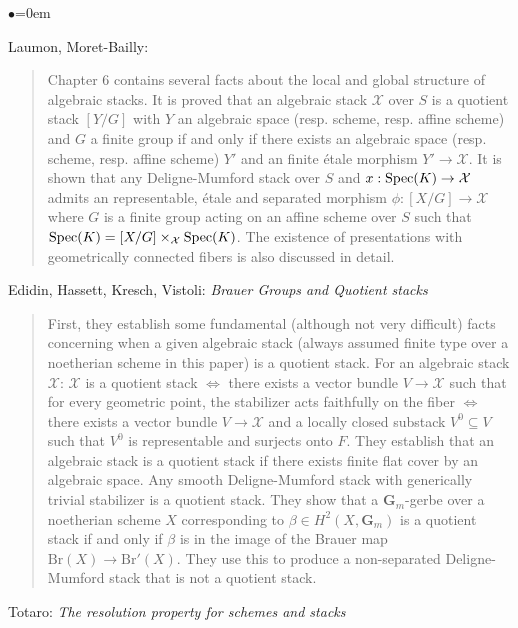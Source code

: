 \begin{list}{$\bullet$}{\leftmargin=0em}
\item Laumon, Moret-Bailly: \cite[Chapter 6]{lmb} 
\begin{quote}
Chapter 6 contains several facts about the local and global structure of 
algebraic stacks. It is proved that an algebraic stack $\mathcal{X}$ over $S$ 
is a 
quotient stack $[Y/G]$ with $Y$ an algebraic space (resp. scheme, resp. affine 
scheme) and $G$ a finite group if and only if there exists an algebraic space 
(resp. scheme, resp. affine scheme) $Y'$ and an finite \'etale morphism $Y' 
\to \mathcal{X}$. It is shown that any Deligne-Mumford stack over $S$ and
$x : \mathop{\rm Spec}(K) \to \mathcal{X}$ admits an representable, \'etale and
separated morphism $\phi : [X/G] \to \mathcal{X}$ where $G$ is a finite group
acting on an affine scheme over $S$ such 
that $\mathop{\rm Spec}(K) = [X/G] \times_{\mathcal{X}} \mathop{\rm Spec}(K)$.
The existence of presentations 
with geometrically connected fibers is also discussed in detail.
\end{quote}
\smallskip
\item
Edidin, Hassett, Kresch, Vistoli:
\emph{Brauer Groups and Quotient stacks} \cite{ehkv}
\begin{quote}
First, they establish some fundamental (although not very difficult)
facts concerning 
when a given algebraic stack (always assumed finite type over a noetherian 
scheme in this paper) is a quotient stack. For an algebraic stack 
$\mathcal{X}$: 
$\mathcal{X}$ is a quotient stack $\iff$ there exists a vector bundle $V \to 
\mathcal{X}$ such 
that for every geometric point, the stabilizer acts faithfully on the fiber 
$\iff$ there exists a vector bundle $V \to \mathcal{X}$ and a locally closed 
substack 
$V^0 \subseteq V$ such that $V^0$ is representable and surjects onto $F$. They 
establish that an algebraic stack is a quotient stack if there exists finite 
flat cover by an algebraic space. Any smooth Deligne-Mumford stack with 
generically trivial stabilizer is a quotient stack.
They show that a $\mathbf{G}_m$-gerbe over a noetherian scheme $X$ 
corresponding to 
$\beta \in H^2(X, \mathbf{G}_m)$ is a quotient stack if and only if $\beta$ is 
in the 
image of the Brauer map $\text{Br}(X) \to \text{Br}'(X)$. They use this to 
produce a 
non-separated Deligne-Mumford stack that is not a quotient stack. 
\end{quote}
\smallskip
\item Totaro: \emph{The resolution property for schemes and stacks} 
\cite{totaro_resolution}

\end{list}
